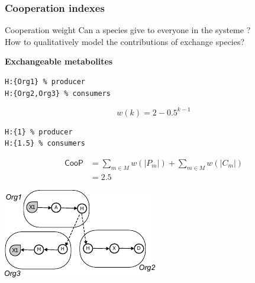 \documentclass[8pt,usenames,dvipsnames]{beamer}
\begin{document}
\begin{frame}[fragile]
\frametitle{Cooperation  indexes}


\begin{minipage}{0.5\textwidth}
\begin{block}{Cooperation weight}
Can a species give to everyone in the systeme ? \\
How to qualitatively model the contributions of exchange species?
\end{block}
\textbf{Exchangeable metabolites}\\
\begin{lstlisting}[mathescape=True]
H:{Org1} % producer
H:{Org2,Org3} % consumers
\end{lstlisting}


\[
w(k) = 2-{0.5^{k-1}}
\]


\begin{lstlisting}[mathescape=True]
H:{1} % producer
H:{1.5} % consumers
\end{lstlisting}
\[
\begin{split}
    \textsf{CooP} &= \sum_{m\in M} w(|P_m|) + \sum_{m\in M} w(|C_m|)\\
      &=  2.5
\end{split}
\]


\end{minipage}%
\hspace{0.5cm}
\hfill
\begin{minipage}{0.4\textwidth}
\includegraphics[width=\textwidth]{figures/exchanged.pdf}
\end{minipage}
\end{frame}
\end{document}

